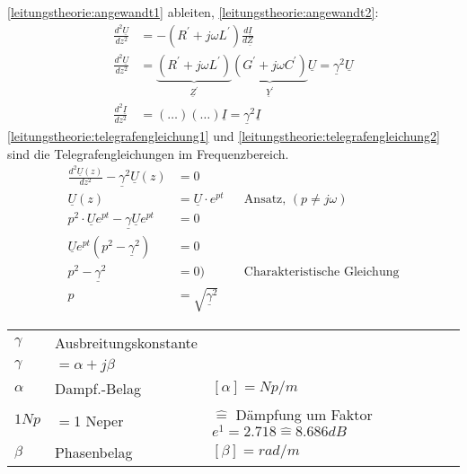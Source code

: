 \ref{leitungstheorie:angewandt1} ableiten, \ref{leitungstheorie:angewandt2}:
\begin{align}
	\frac{d^2\underline{U}}{dz^2}&=-\left(R^\prime+j\omega
	L^\prime\right)\frac{d\underline{I}}{d\underline{Z}}\nonumber\\
	\frac{d^2\underline{U}}{dz^2}&=\underbrace{\left(R^\prime+j\omega
	L^\prime\right)}_{\underline{Z}^\prime}\underbrace{\left(G^\prime+j\omega
	C^\prime\right)}_{\underline{Y}^\prime}\underline{U}=\underline{\gamma}^2\underline{U}\label{leitungstheorie:telegrafengleichung1}\\
	\frac{d^2\underline{I}}{dz^2}&=\left(\ldots\right)\left(\ldots\right)\underline{I}=\underline{\gamma}^2\underline{I}\label{leitungstheorie:telegrafengleichung2}
\end{align}
\ref{leitungstheorie:telegrafengleichung1} und
\ref{leitungstheorie:telegrafengleichung2} sind die Telegrafengleichungen im
Frequenzbereich.\\
\begin{align}
	\frac{d^2\underline{U}(z)}{dz^2}-\underline{\gamma}^2\underline{U}(z)&=0\nonumber\\
	\underline{U}(z)&=\underline{U}\cdot e^{pt}&&\text{Ansatz, }(p \neq
	j\omega)\nonumber\\
	p^2\cdot
	\underline{U}e^{pt}-\underline{\gamma}\underline{U}e^{pt}&=0\nonumber\\
	\underline{U}e^{pt}\left(p^2-\underline{\gamma}^2\right)&=0\nonumber\\
	p^2-\underline{\gamma}^2&=0)&&\text{Charakteristische Gleichung}\nonumber\\
	p&=\sqrt{\underline{\gamma}^2}\nonumber
\end{align}
\begin{tabular}{lll}
$\gamma$ & Ausbreitungskonstante \\
$\gamma$ & $= \alpha +j\beta$ \\
$\alpha$ & Dampf.-Belag & $[\alpha]=Np/m$\\
$1Np$ & $=$1 Neper & $\mathrel{\widehat{=}}$ Dämpfung um Faktor
$e^1=2.718\mathrel{\widehat{=}}8.686dB$\\
$\beta$ & Phasenbelag & $[\beta]=rad/m$\\
\end{tabular}


